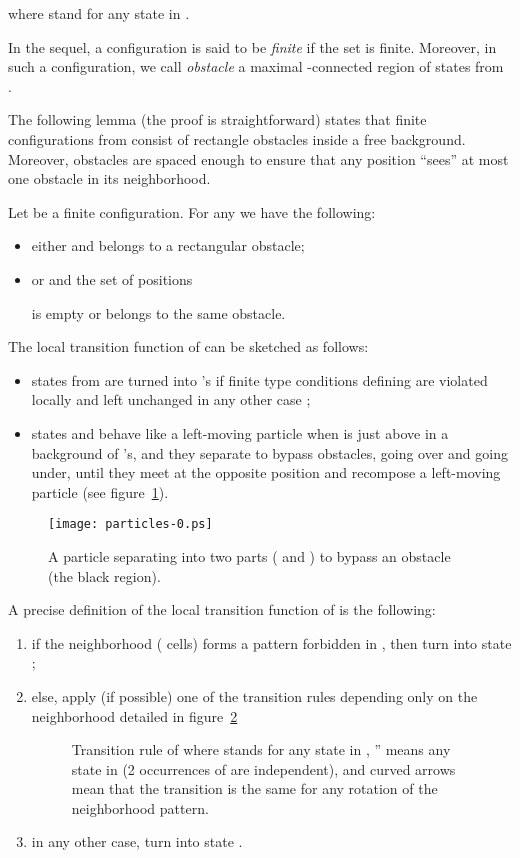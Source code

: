 \documentclass{llncs}
\begin{document}
where  stand for any state in .  

In the sequel, a configuration  is said to be \emph{finite} if the
set  is finite. Moreover, in such a
configuration, we call \emph{obstacle} a maximal -connected region
of states from .

The following lemma (the proof is straightforward) states that finite
configurations from  consist of rectangle obstacles inside a
free  background. Moreover, obstacles are spaced
enough to ensure that any position ``sees'' at most one obstacle in
its  neighborhood.

\begin{lemma}
  Let  be a finite configuration. For any  we
  have the following:
  \begin{itemize}
  \item either  and  belongs to a rectangular obstacle;
  \item or  and the set of positions
    
    is empty or belongs to the same obstacle.
  \end{itemize}
\end{lemma}

The local transition function of  can be sketched as follows:
\begin{itemize}
\item states from  are turned into 's if finite type
  conditions defining  are violated locally and left unchanged
  in any other case ;
\item states  and  behave like a left-moving particle when 
  is just above  in a background of 's, and they separate to
  bypass obstacles,  going over and  going under, until they
  meet at the opposite position and recompose a left-moving particle
  (see figure~\ref{fig:partdyn}).
\end{itemize}

\begin{figure}
  \centering
  \texttt{[image: particles-0.ps]}
  \caption{A particle separating into two parts ( and ) to
    bypass an obstacle (the black region).}
  \label{fig:partdyn}
\end{figure}

A precise definition of the local transition function of  is the following:
\begin{enumerate}
\item if the neighborhood ( cells) forms a pattern
  forbidden in , then turn into state  ;
\item else, apply (if possible) one of the transition rules depending
  only on the  neighborhood detailed in
  figure~\ref{fig:defi}
  \begin{figure}
    \centering
    {\tiny}
    \caption{Transition rule of  where  stands for any state
      in , '' means any state in 
      (2 occurrences of  are independent), and curved arrows
       mean that the transition is the same for
      any rotation of the neighborhood pattern.}
\label{fig:defi}
\end{figure}

\item in any other case, turn into state .
\end{enumerate}
\end{document}
